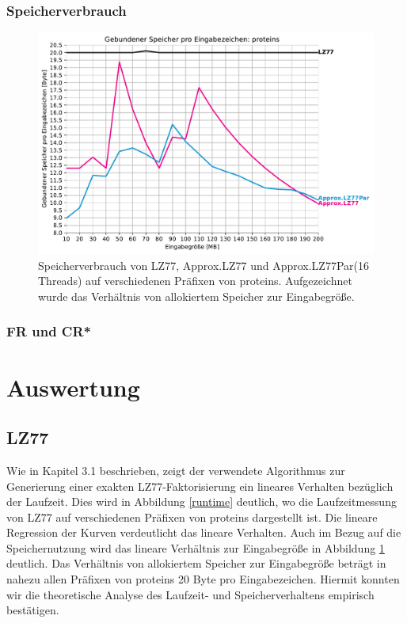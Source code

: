 \subsubsection{Speicherverbrauch}
\begin{figure}[ht]
    \centering
    \caption{Speicherverbrauch von LZ77, Approx.LZ77 und Approx.LZ77Par(16 Threads) auf verschiedenen Präfixen von proteins. Aufgezeichnet wurde das Verhältnis
    von allokiertem Speicher zur Eingabegröße.}
    \label{memory}
    \includegraphics[scale=0.6]{Images/progressive_mem.pdf}
\end{figure}
\subsubsection{FR und CR*}

\section{Auswertung}
\subsection{LZ77}
Wie in Kapitel 3.1 beschrieben, zeigt der verwendete Algorithmus zur Generierung einer exakten LZ77-Faktorisierung ein lineares Verhalten bezüglich der Laufzeit.
Dies wird in Abbildung \ref{runtime} deutlich, wo die Laufzeitmessung von LZ77 auf verschiedenen Präfixen von proteins dargestellt ist. Die lineare Regression der
Kurven verdeutlicht das lineare Verhalten. Auch im Bezug auf die Speichernutzung wird das lineare Verhältnis zur Eingabegröße in Abbildung \ref{memory} deutlich.
Das Verhältnis von allokiertem Speicher zur Eingabegröße beträgt in nahezu allen Präfixen von proteins 20 Byte pro Eingabezeichen. Hiermit konnten wir die theoretische
Analyse des Laufzeit- und Speicherverhaltens empirisch bestätigen.

